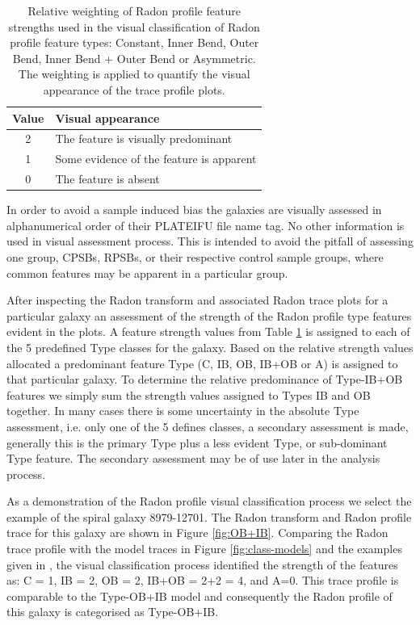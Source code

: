 \begin{table}
    \caption[Relative weighting of Radon profile feature strengths used in visual classification]{Relative weighting of Radon profile feature strengths used in the visual classification of Radon profile feature types: Constant, Inner Bend, Outer Bend, Inner Bend + Outer Bend or Asymmetric. The weighting is applied to quantify the visual appearance of the trace profile plots.}
    \label{tab:features}
    \centering
    \begin{tabular}{cl}
    \hline
    Value & Visual appearance \\
    \hline
    2 & The feature is visually predominant \\
    1 & Some evidence of the feature is apparent \\
    0 & The feature is absent \\
    \hline
    \end{tabular}
\end{table}

In order to avoid a sample induced bias the galaxies are visually assessed in alphanumerical order of their PLATEIFU file name tag. No other information is used in visual assessment process. This is intended to avoid the pitfall of assessing one group, CPSBs, RPSBs, or their respective control sample groups, where common features may be apparent in a particular group. 

After inspecting the Radon transform and associated Radon trace plots for a particular galaxy an assessment of the strength of the Radon profile type features evident in the plots. A feature strength values from Table \ref{tab:features} is assigned to each of the 5 predefined Type classes for the galaxy. Based on the relative strength values allocated a predominant feature Type (C, IB, OB, IB+OB or A) is assigned to that particular galaxy. To determine the relative predominance of Type-IB+OB features we simply sum the strength values assigned to Types IB and OB together. 
In many cases there is some uncertainty in the absolute Type assessment, i.e. only one of the 5 defines classes, a secondary assessment is made,  generally this is the primary Type plus a less evident Type, or sub-dominant Type feature. The secondary assessment may be of use later in the analysis process.

As a demonstration of the Radon profile visual classification process we select the example of the spiral galaxy 8979-12701. The Radon transform and Radon profile trace for this galaxy are shown in Figure \ref{fig:OB+IB}. Comparing the Radon trace profile with the model traces in Figure \ref{fig:class-models} and the examples given in  \citet[Figure 7 of][]{2018MNRAS.480.2217S}, the visual classification process identified the strength of the features as: C = 1, IB = 2, OB = 2, IB+OB = 2+2 = 4, and A=0. This trace profile is comparable to the Type-OB+IB model and consequently the Radon profile of this galaxy is categorised as Type-OB+IB.

